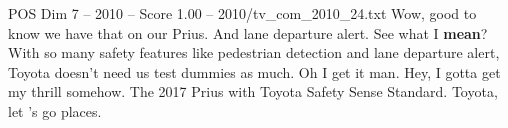 \begin{textsample}{POS Dim 7 – 2010 – Score 1.00 – 2010/tv\_com\_2010\_24.txt}  \label{ex:f7_pos_075}
Wow, good to know we have that on our Prius.
And lane departure alert.
See what I \textbf{mean}?
With so many safety features like pedestrian detection and lane departure alert, Toyota doesn't need us test dummies as much.
Oh I get it man.
Hey, I gotta get my thrill somehow.
The 2017 Prius with Toyota Safety Sense Standard.
Toyota, let 's go places.

\end{textsample}
